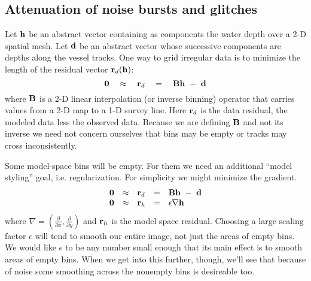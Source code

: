 

\subsection{Attenuation of noise bursts and glitches}


Let $\bold{h}$ be an abstract vector containing as components
the water depth over a 2-D spatial mesh.
Let $\bold{d}$ be an abstract vector whose successive components
are depths along the vessel tracks.
One way to grid irregular data is to minimize the length 
of the residual vector $\bold r_d(\bold h)$:
\begin{equation}
	\bold 0 \quad\approx\quad \bold r_d \quad=\quad \bold B \bold h \ -\  \bold d    \label{eqn:eq0}
\end{equation}
where $\bold B$ is a 2-D linear interpolation (or inverse binning) operator 
that carries values from a 2-D map to a 1-D survey line.
Here $\bold r_d$ is the data residual,
the modeled data less the observed data.
Because we are defining $\bold B$ and not its inverse
we need not concern ourselves that bins may be empty
or tracks may cross inconsistently.


\par

Some model-space bins will be empty.
For them we need an additional ``model styling'' goal,
i.e. regularization.
For simplicity we might minimize the gradient.
\begin{equation}
  \begin{array}{lllll}
    \bold 0 &\approx& \bold r_d &=& \bold B \bold h \ -\  \bold d \\
    \bold 0 &\approx& \bold r_h &=& \epsilon \nabla \bold h 
  \end{array} \label{eqn:eq1}
\end{equation}
where $\nabla=\left ( \frac{\partial}{\partial x},
\frac{\partial}{\partial y}\right)$ and $\bold r_h$ is the model space
residual.
Choosing a large scaling factor $\epsilon$ will tend to smooth
our entire image, not just the areas of empty bins.
We would like $\epsilon$ to be any number small enough
that its main effect is to smooth areas of empty bins.
When we get into this further, though, we'll see that
because of noise
some smoothing across the nonempty bins is desireable too.


